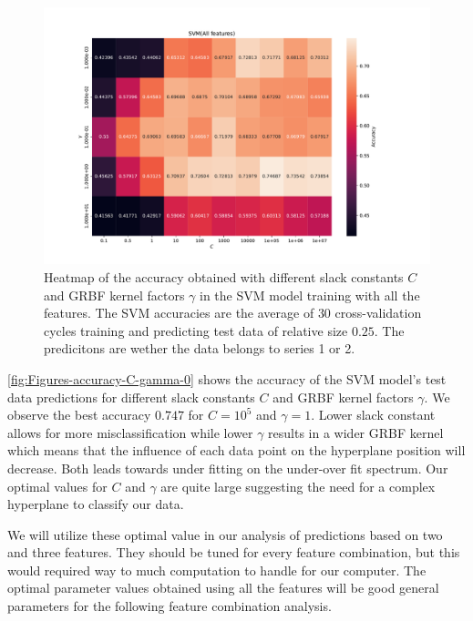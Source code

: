 \begin{figure}[H]
\centering
\includegraphics[width=1\textwidth]{Figures/accuracy(C,gamma)0}
\caption{Heatmap of the accuracy obtained with different slack constants $C$ and 
GRBF kernel factors $\gamma $ in the SVM model training with all the features. The SVM accuracies are the average of $30$ cross-validation 
cycles training and predicting test data of relative size $0.25$.
The predicitons are wether the data belongs to series 1 or 2.}
\label{fig:Figures-accuracy-C-gamma-0}
\end{figure}
\autoref{fig:Figures-accuracy-C-gamma-0} shows the accuracy of the SVM model's 
test data predictions for different slack constants $C$ and GRBF kernel factors $\gamma $. 
We observe the best accuracy $0.747$ for $C=10^5$ and $\gamma =1$. Lower slack constant 
allows for more misclassification while lower $\gamma $ results in a wider 
GRBF kernel which means that the influence of each data point on the hyperplane 
position will decrease. Both leads towards under fitting on the under-over fit spectrum.
Our optimal values for $C$ and $\gamma $ are quite large suggesting the need for 
a complex hyperplane to classify our data. 

We will utilize these optimal value in our analysis of predictions based on two and three 
features. They should be tuned for every feature combination, but this would required 
way to much computation to handle for our computer. The optimal parameter values 
obtained using all the features will be good general parameters for the following 
feature combination analysis. 

